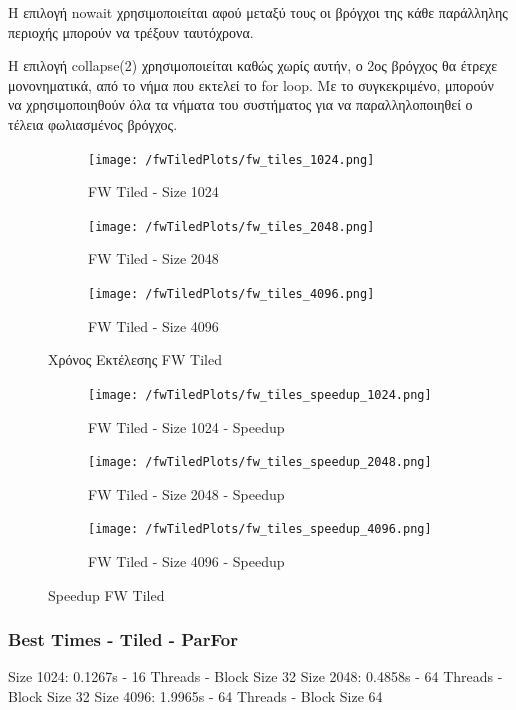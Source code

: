 \documentclass[letterpaper,12pt]{article}
\begin{document}
Η επιλογή nowait χρησιμοποιείται αφού μεταξύ τους οι βρόγχοι της κάθε παράλληλης περιοχής
μπορούν να τρέξουν ταυτόχρονα. 

Η επιλογή collapse(2) χρησιμοποιείται καθώς χωρίς αυτήν, ο 2ος βρόγχος θα έτρεχε μονονηματικά,
από το νήμα που εκτελεί το for loop. Με το συγκεκριμένο, μπορούν να χρησιμοποιηθούν
όλα τα νήματα του συστήματος για να παραλληλοποιηθεί ο τέλεια φωλιασμένος βρόγχος.


\begin{figure}[H]
    \centering
    \begin{subfigure}[b]{0.48\linewidth}
        \texttt{[image: /fwTiledPlots/fw\_tiles\_1024.png]}
        \caption{FW Tiled - Size 1024}
    \end{subfigure}
    \begin{subfigure}[b]{0.48\linewidth}
        \texttt{[image: /fwTiledPlots/fw\_tiles\_2048.png]}
        \caption{FW Tiled - Size 2048}
    \end{subfigure}
    \begin{subfigure}[b]{0.5\linewidth}
        \texttt{[image: /fwTiledPlots/fw\_tiles\_4096.png]}
        \caption{FW Tiled - Size 4096}
    \end{subfigure}
    \caption{Χρόνος Εκτέλεσης FW Tiled}
    \label{fig:Χρόνος Εκτέλεσης FW Tiled}
\end{figure}

\begin{figure}[H]
    \centering
    \begin{subfigure}[b]{0.48\linewidth}
        \texttt{[image: /fwTiledPlots/fw\_tiles\_speedup\_1024.png]}
        \caption{FW Tiled - Size 1024 - Speedup}
    \end{subfigure}
    \begin{subfigure}[b]{0.48\linewidth}
        \texttt{[image: /fwTiledPlots/fw\_tiles\_speedup\_2048.png]}
        \caption{FW Tiled - Size 2048 - Speedup}
    \end{subfigure}
    \begin{subfigure}[b]{0.5\linewidth}
        \texttt{[image: /fwTiledPlots/fw\_tiles\_speedup\_4096.png]}
        \caption{FW Tiled - Size 4096 - Speedup}
    \end{subfigure}
    \caption{Speedup FW Tiled}
    \label{fig:Speedup FW Tiled}
\end{figure}

\subsubsection*{Best Times - Tiled - ParFor}
Size 1024: 0.1267s - 16 Threads - Block Size 32
\newline
Size 2048: 0.4858s - 64 Threads - Block Size 32
\newline
Size 4096: 1.9965s - 64 Threads - Block Size 64
\newline
\end{document}

